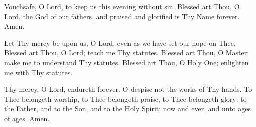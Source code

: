 \documentclass[twoside, letterpaper, 12pt]{report}
\begin{document}

Vouchsafe, O Lord, to keep us this evening without sin.
Blessed art Thou, O Lord, the God of our fathers,
and praised and glorified is Thy Name forever. Amen.

Let Thy mercy be upon us, O Lord, even as we have set our hope on Thee.
Blessed art Thou, O Lord; teach me Thy statutes. Blessed art Thou, O Master;
make me to understand Thy statutes.
Blessed art Thou, O Holy One; enlighten me with Thy statutes.

Thy mercy, O Lord, endureth forever. O despise not the works of Thy hands.
To Thee belongeth worship, to Thee belongeth praise, to Thee belongeth glory:
to the Father, and to the Son, and to the Holy Spirit;
now and ever, and unto ages of ages. Amen.
\end{document}
